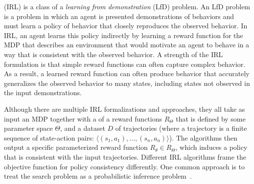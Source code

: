  (IRL) is a class of a {\em
  learning from demonstration} (LfD) problem. An LfD problem is a
problem in which an agent is presented demonstrations of behaviors and
must learn a policy of behavior that closely reproduces the observed
behavior. In IRL, an agent learns this policy indirectly by learning a
reward function for the MDP that describes an environment that would
motivate an agent to behave in a way that is consistent with the
observed behavior. A strength of the IRL formulation is that simple
reward functions can often capture complex behavior. As a result, a
learned reward function can often produce behavior that accurately
generalizes the observed behavior to many states, including states not
observed in the input demonstrations.

Although there are multiple IRL formalizations and approaches, they
all take as input an MDP together with a  of a reward
functions $R_\Theta$ that is defined by some parameter space $\Theta$,
and a dataset $D$ of trajectories (where a trajectory is a finite
sequence of state-action pairs: $\langle (s_1, a_1), ..., (s_n, a_n)
\rangle$). The algorithms then output a specific parameterized reward
function $R_\theta \in R_\Theta$, which induces a policy that is
consistent with the input trajectories.
%
Different IRL algorithms frame the objective function for policy
consistency differently. One common approach is to treat the
search problem as a probabilistic inference
problem~\cite{babes11,lopes2009active,ramachandran2007bayesian,ziebart2008maximum}. 


